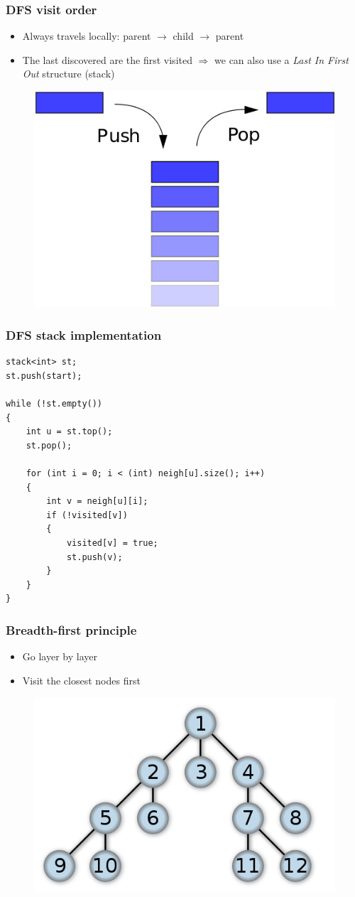 \documentclass[12pt]{beamer}
\begin{document}
\begin{frame}
\frametitle{DFS visit order}
\begin{itemize}
\item Always travels locally: parent $\to$ child $\to$ parent
\item The last discovered are the first visited $\Rightarrow$ we can also use a \emph{Last In First Out} structure (stack)
\end{itemize}
\begin{figure}
\centering
\includegraphics[width=.5\linewidth]{img/stack}
\end{figure}
\end{frame}

\begin{frame}[fragile]
\frametitle{DFS stack implementation}
\begin{lstlisting}
stack<int> st;
st.push(start);

while (!st.empty())
{
    int u = st.top();
    st.pop();
    
    for (int i = 0; i < (int) neigh[u].size(); i++)
    {
        int v = neigh[u][i];
        if (!visited[v])
        {
            visited[v] = true;
            st.push(v);
        }
    }
}
\end{lstlisting}
\end{frame}

\begin{frame}
\frametitle{Breadth-first principle}
\begin{itemize}
\item Go layer by layer
\item Visit the closest nodes first
\end{itemize}
\begin{figure}
\centering
\includegraphics[width=.5\linewidth]{img/bfs-tree}
\end{figure}
\end{frame}
\end{document}
